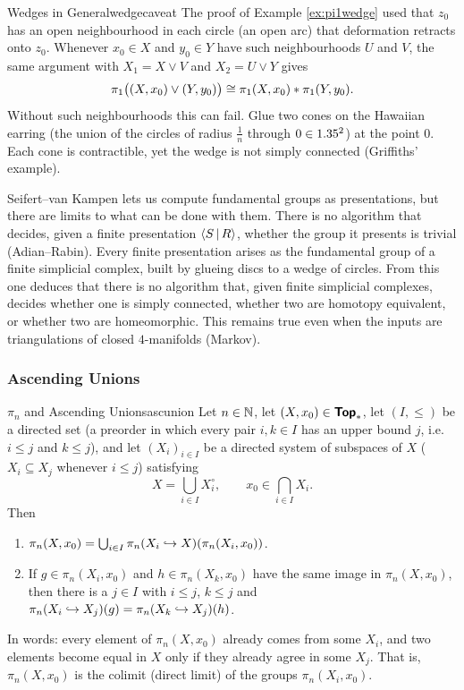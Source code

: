 \begin{remark}{Wedges in General}{wedgecaveat}
  The proof of Example \ref{ex:pi1wedge} used that $z_0$ has an open neighbourhood in each circle (an open arc) that deformation retracts onto $z_0$. Whenever $x_0\in X$ and $y_0\in Y$ have such neighbourhoods $U$ and $V$, the same argument with $X_1=X\lor V$ and $X_2=U\lor Y$ gives \[
    \pi_1\big((X,x_0)\lor(Y,y_0)\big)\cong\pi_1(X,x_0)\ast\pi_1(Y,y_0).
  \]
  Without such neighbourhoods this can fail. Glue two cones on the Hawaiian earring (the union of the circles of radius $\frac1n$ through $0\in1.35^2$) at the point $0$. Each cone is contractible, yet the wedge is not simply connected (Griffiths' example).
\end{remark}

Seifert--van Kampen lets us compute fundamental groups as presentations, but there are limits to what can be done with them. There is no algorithm that decides, given a finite presentation $\left\langle S\,\middle|\,R\right\rangle$, whether the group it presents is trivial (Adian--Rabin). Every finite presentation arises as the fundamental group of a finite simplicial complex, built by glueing discs to a wedge of circles. From this one deduces that there is no algorithm that, given finite simplicial complexes, decides whether one is simply connected, whether two are homotopy equivalent, or whether two are homeomorphic. This remains true even when the inputs are triangulations of closed $4$-manifolds (Markov).

\subsubsection{Ascending Unions}

\begin{theorem}{$\pi_n$ and Ascending Unions}{ascunion}
  Let $n\in\mathbb{N}$, let $(X,x_0)\in\bm{\mathsf{Top}}_*$, let $(I,\leq)$ be a directed set (a preorder in which every pair $i,k\in I$ has an upper bound $j$, i.e.\ $i\leq j$ and $k\leq j$), and let $(X_i)_{i\in I}$ be a directed system of subspaces of $X$ ($X_i\subseteq X_j$ whenever $i\leq j$) satisfying \[
    X = \bigcup_{i\in I}X_i^\circ, \qquad x_0\in\bigcap_{i\in I}X_i.
  \]
  Then \begin{enumerate}
    \item $\pi_n(X,x_0)=\bigcup_{i\in I}\pi_n(X_i\hookrightarrow X)(\pi_n(X_i,x_0))$.
    \item If $g\in\pi_n(X_i,x_0)$ and $h\in\pi_n(X_k,x_0)$ have the same image in $\pi_n(X,x_0)$, then there is a $j\in I$ with $i\leq j$, $k\leq j$ and $\pi_n(X_i\hookrightarrow X_j)(g)=\pi_n(X_k\hookrightarrow X_j)(h)$.
  \end{enumerate}
  In words: every element of $\pi_n(X,x_0)$ already comes from some $X_i$, and two elements become equal in $X$ only if they already agree in some $X_j$. That is, $\pi_n(X,x_0)$ is the colimit (direct limit) of the groups $\pi_n(X_i,x_0)$.
\end{theorem}

